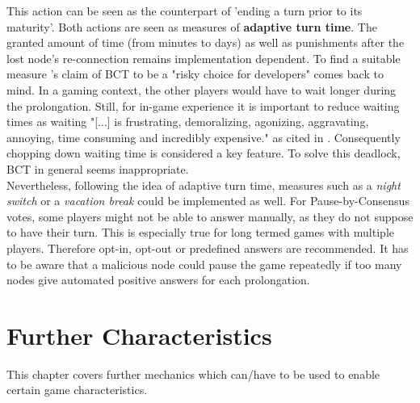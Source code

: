 This action can be seen as the counterpart of 'ending a turn prior to its maturity'.
Both actions are seen as measures of \textbf{adaptive turn time}.\label{sec:AdaptiveTurntime}
The granted amount of time (from minutes to days) as well as punishments after the lost node's re-connection remains implementation dependent.
To find a suitable measure \citet[27]{Laneve.2019}'s claim of \gls{BCT} to be a "risky choice for developers" comes back to mind.
In a gaming context, the other players would have to wait longer during the prolongation.
Still, for in-game experience it is important to reduce waiting times as waiting "[...] is frustrating, demoralizing, agonizing, aggravating, annoying, time consuming and incredibly expensive." \citet{Buffa.1976} as cited in \cite[1]{Maister.1984}.
Consequently chopping down waiting time is considered a key feature.
To solve this deadlock, \gls{BCT} in general seems inappropriate. \\
Nevertheless, following the idea of adaptive turn time, measures such as a \textit{night switch} or a \textit{vacation break} could be implemented as well.
For Pause-by-Consensus votes, some players might not be able to answer manually, as they do not suppose to have their turn.
This is especially true for long termed games with multiple players.
Therefore opt-in, opt-out or predefined answers are recommended.
It has to be aware that a malicious node could pause the game repeatedly if too many nodes give automated positive answers for each prolongation.



\FloatBarrier

\section{Further Characteristics}
\label{sec:FurtherCharacteristics}
This chapter covers further mechanics which can/have to be used to enable certain game characteristics.

